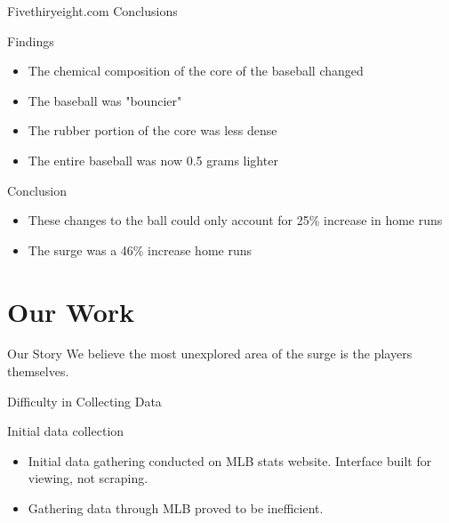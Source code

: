 \documentclass[14pt]{bredelebeamer}
\begin{document}
\begin{frame}{Fivethiryeight.com Conclusions}


\begin{block}{Findings}
	\begin{itemize}
    	\item The chemical composition of the core of the baseball changed
        \item The baseball was "bouncier"
        \item The rubber portion of the core was less dense
        \item The entire baseball was now 0.5 grams lighter 
    \end{itemize}
\end{block}
\begin{block}{Conclusion}
	\begin{itemize}
    	\item These changes to the ball could only account for 25\% increase in home runs
        \item The surge was a 46\% increase home runs
    \end{itemize}
\end{block}

\end{frame}


\section{Our Work}

\begin{frame}

\begin{block}{\large Our Story}
{ \large We believe the most unexplored area of the surge is the players themselves.\\}

\end{block}	

\end{frame}



\begin{frame}{Difficulty in Collecting Data}
\begin{block}{Initial data collection}
\begin{itemize}
\item Initial data gathering conducted on MLB stats website. Interface built for viewing, not scraping.
\item Gathering data through MLB proved to be inefficient.
\end{itemize}
\end{block}
\end{frame}
\end{document}

